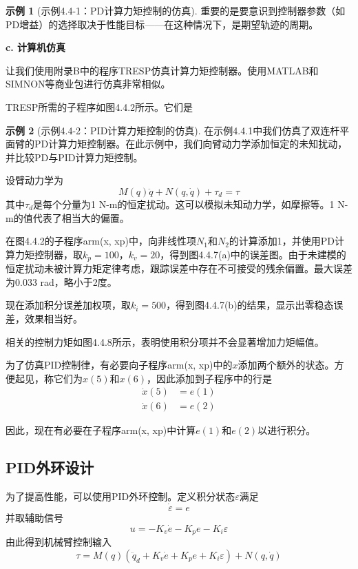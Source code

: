 \documentclass[UTF8]{ctexart}
\theoremstyle{definition}
\newtheorem{example}{示例}[section]
\begin{document}
\begin{example}[示例4.4-1：PD计算力矩控制的仿真]
重要的是要意识到控制器参数（如PD增益）的选择取决于性能目标——在这种情况下，是期望轨迹的周期。

\textbf{c. 计算机仿真}

让我们使用附录B中的程序TRESP仿真计算力矩控制器。使用MATLAB和SIMNON等商业包进行仿真非常相似。

TRESP所需的子程序如图4.4.2所示。它们是
\end{example}

\begin{example}[示例4.4-2：PID计算力矩控制的仿真]
在示例4.4.1中我们仿真了双连杆平面臂的PD计算力矩控制器。在此示例中，我们向臂动力学添加恒定的未知扰动，并比较PD与PID计算力矩控制。

设臂动力学为
\begin{equation*}
    M(q)\ddot{q} + N(q, \dot{q}) + \tau_d = \tau
\end{equation*}
其中$\tau_d$是每个分量为1 N-m的恒定扰动。这可以模拟未知动力学，如摩擦等。1 N-m的值代表了相当大的偏置。

在图4.4.2的子程序arm(x, xp)中，向非线性项$N_1$和$N_2$的计算添加1，并使用PD计算力矩控制器，取$k_p=100$，$k_v=20$，得到图4.4.7(a)中的误差图。由于未建模的恒定扰动未被计算力矩定律考虑，跟踪误差中存在不可接受的残余偏置。最大误差为0.033 rad，略小于2度。

现在添加积分误差加权项，取$k_i=500$，得到图4.4.7(b)的结果，显示出零稳态误差，效果相当好。

相关的控制力矩如图4.4.8所示，表明使用积分项并不会显著增加力矩幅值。

为了仿真PID控制律，有必要向子程序arm(x, xp)中的$x$添加两个额外的状态。方便起见，称它们为$x(5)$和$x(6)$，因此添加到子程序中的行是
\begin{align*}
    \dot{x}(5) &= e(1) \\
    \dot{x}(6) &= e(2)
\end{align*}

因此，现在有必要在子程序arm(x, xp)中计算$e(1)$和$e(2)$以进行积分。
\end{example}

\subsection{PID外环设计}

为了提高性能，可以使用PID外环控制。定义积分状态$\varepsilon$满足
\begin{equation}\label{eq:4.4.34}
    \dot{\varepsilon} = e
\end{equation}
并取辅助信号
\begin{equation}\label{eq:4.4.35}
    u = -K_v\dot{e} - K_pe - K_i\varepsilon
\end{equation}
由此得到机械臂控制输入
\begin{equation}\label{eq:4.4.36}
    \tau = M(q)\left(\ddot{q}_d + K_v\dot{e} + K_pe + K_i\varepsilon\right) + N(q, \dot{q})
\end{equation}
\end{document}
